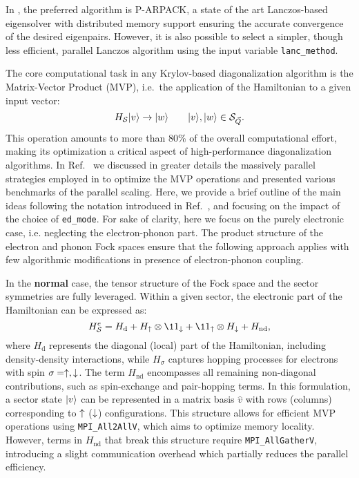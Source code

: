 \documentclass[edipack_sp.tex]{subfiles}
\begin{document}
In \NAME, the preferred algorithm is P-ARPACK, a state of the art
Lanczos-based eigensolver with distributed memory support
\cite{Lehoucq1998} ensuring the accurate convergence of the desired eigenpairs. 
However, it is also possible to select a simpler,
though less efficient, parallel Lanczos algorithm using the input variable {\tt lanc\_method}.

The core computational task in any Krylov-based diagonalization
algorithm is the Matrix-Vector Product (MVP), i.e.~the application
of the Hamiltonian to a given input vector:
\begin{equation}
H_{\cal S} |v\rangle \to |w\rangle\qquad |v\rangle,|w\rangle\in {\cal S}_{\vec{Q}}.
\end{equation}
This operation amounts to more than 80\% of the overall
computational effort, making its optimization a critical aspect of
high-performance diagonalization algorithms. In Ref.~\cite{Amaricci2022CPC} we discussed in greater details the massively parallel strategies  employed in \NAME to optimize the MVP operations and presented various benchmarks of the parallel scaling. 
Here, we provide a brief outline of the main ideas following the notation introduced
in Ref.~, and focusing on the impact of the choice of {\tt ed\_mode}. 
For sake of clarity, here we focus on the purely electronic case, i.e. neglecting the electron-phonon part. The product structure of the electron and phonon Fock spaces ensure that the following approach applies with few algorithmic modifications in presence of electron-phonon coupling.  



In the {\bf normal} case, the tensor structure of the Fock space and the sector
symmetries are fully leveraged. Within a given sector, the electronic
part of the Hamiltonian can be expressed as:
\begin{equation}
H^e_{\SS} = H_\mathrm{d} + H_\up\otimes \11_\dw + \11_\up\otimes
H_\dw + H_\mathrm{nd},
\label{HssNormal}
\end{equation}
where $H_\mathrm{d}$ represents the diagonal (local) part of the
Hamiltonian, including density-density interactions, while
$H_\sigma$ captures hopping processes for electrons with spin
$\sigma=\uparrow,\downarrow$. The term $H_\mathrm{nd}$ encompasses all remaining
non-diagonal contributions, such as spin-exchange and pair-hopping
terms.
%
In this formulation, a sector state $|v\rangle$ can be
represented in a matrix basis $\hat{v}$ with rows (columns)
corresponding to $\uparrow$ ($\downarrow$) configurations. This structure allows
for efficient MVP operations using {\tt MPI\_All2AllV}, which aims to
optimize memory locality. However, terms in $H_\mathrm{nd}$ that
break this structure require {\tt MPI\_AllGatherV}, introducing a
slight communication overhead which partially reduces the parallel efficiency.
\end{document}
